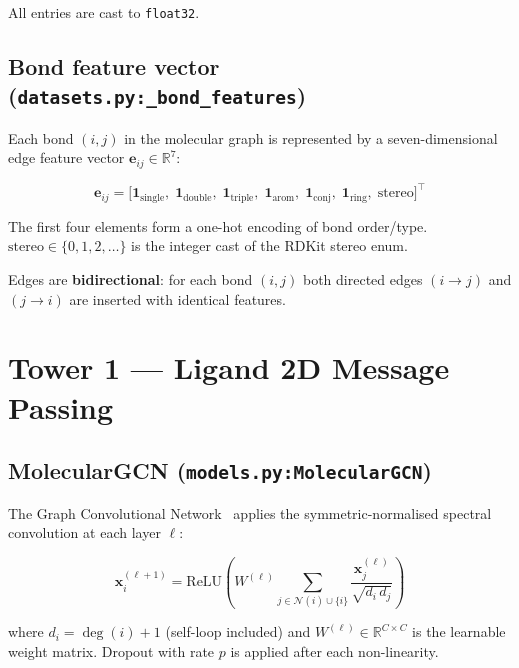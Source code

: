 \documentclass[11pt,a4paper]{article}
\newcommand{\R}{\mathbb{R}}
\newcommand{\bx}{\mathbf{x}}
\newcommand{\be}{\mathbf{e}}
\newcommand{\ReLU}{\mathrm{ReLU}}
\newcommand{\code}[1]{\texttt{#1}}
\begin{document}
All entries are cast to \texttt{float32}.

\subsection{Bond feature vector (\code{datasets.py:\_bond\_features})}

Each bond $(i,j)$ in the molecular graph is represented by a seven-dimensional edge
feature vector $\be_{ij} \in \R^7$:

\begin{equation}
\be_{ij} =
\bigl[
  \mathbf{1}_{\text{single}},\;
  \mathbf{1}_{\text{double}},\;
  \mathbf{1}_{\text{triple}},\;
  \mathbf{1}_{\text{arom}},\;
  \mathbf{1}_{\text{conj}},\;
  \mathbf{1}_{\text{ring}},\;
  \mathrm{stereo}
\bigr]^{\!\top}
\end{equation}

The first four elements form a one-hot encoding of bond order/type.
$\mathrm{stereo} \in \{0,1,2,\ldots\}$ is the integer cast of the RDKit stereo enum.

Edges are \textbf{bidirectional}: for each bond $(i,j)$ both directed edges
$(i \to j)$ and $(j \to i)$ are inserted with identical features.

\section{Tower 1 --- Ligand 2D Message Passing}
\label{sec:tower1}

\subsection{MolecularGCN (\code{models.py:MolecularGCN})}

The Graph Convolutional Network~\cite{kipf2017} applies the symmetric-normalised
spectral convolution at each layer $\ell$:

\begin{equation}
\bx_i^{(\ell+1)}
= \ReLU\!\left(
    W^{(\ell)} \sum_{j \in \mathcal{N}(i) \cup \{i\}}
    \frac{\bx_j^{(\ell)}}{\sqrt{d_i\, d_j}}
  \right)
\label{eq:gcn}
\end{equation}

where $d_i = \deg(i)+1$ (self-loop included) and $W^{(\ell)} \in \R^{C \times C}$ is
the learnable weight matrix.  Dropout with rate $p$ is applied after each
non-linearity.
\end{document}
